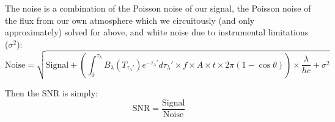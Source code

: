 \documentclass{knac}
\begin{document}
The noise is a combination of the Poisson noise of our signal, the Poisson noise of the flux from our own atmosphere which we circuitously (and only approximately) solved for above, and white noise due to instrumental limitations ($\sigma^2$):
\begin{equation}
 \mathrm{Noise} = \sqrt{\mathrm{Signal} + \left(\int_{0}^{\tau_{\lambda}} B_{\lambda} (T_{\tau_{\lambda}'})e^{-\tau_{\lambda}'}d\tau_{\lambda}' \times f \times A \times t\times 2\pi\left(1 - \cos{\theta}\right)\right)\times\frac{\lambda}{hc} + \sigma^2}
\end{equation}

Then the SNR is simply:
\begin{equation}
    \mathrm{SNR} = \frac{\mathrm{Signal}}{\mathrm{Noise}}
\end{equation}
\end{document}
